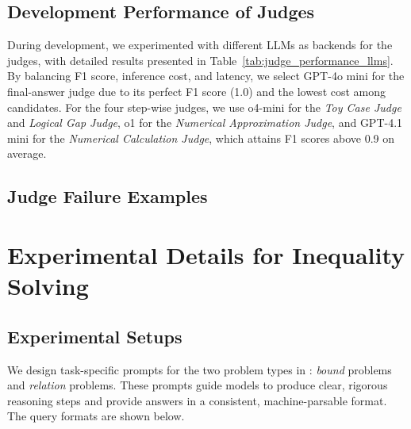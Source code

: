\subsection{Development Performance of Judges}
\label{app:judge_dev_performance}




During development, we experimented with different LLMs as backends for the judges, with detailed results presented in Table~\ref{tab:judge_performance_llms}. By balancing F1 score, inference cost, and latency, we select GPT-4o mini for the final-answer judge due to its perfect F1 score (1.0) and the lowest cost among candidates. For the four step-wise judges, we use o4-mini for the \textit{Toy Case Judge} and \textit{Logical Gap Judge}, o1 for the \textit{Numerical Approximation Judge}, and GPT-4.1 mini for the \textit{Numerical Calculation Judge}, which attains F1 scores above 0.9 on average.

\subsection{Judge Failure Examples}
\label{app:judge_failure_examples}









\clearpage
\section{Experimental Details for Inequality Solving}
\label{app:exp_details}

\subsection{Experimental Setups}
\label{app:exp_setups}

We design task-specific prompts for the two problem types in \dataset: \textit{bound} problems and \textit{relation} problems. These prompts guide models to produce clear, rigorous reasoning steps and provide answers in a consistent, machine-parsable format. The query formats are shown below.





